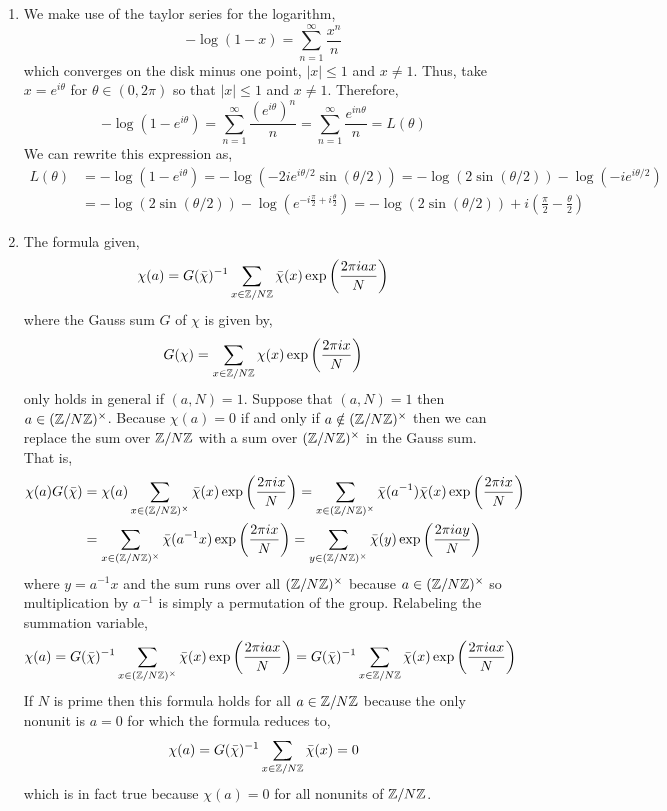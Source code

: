 \documentclass[12pt]{extarticle}
\begin{document}
\begin{enumerate}
\begin{enumerate}
\item We make use of the taylor series for the logarithm,
\[ -\log(1 - x) = \sum_{n = 1}^\infty \frac{x^n}{n}  \]
which converges on the disk minus one point, $|x| \le 1$ and $x \neq 1$. Thus, take $x = e^{i \theta}$ for $\theta \in (0, 2 \pi)$ so that $|x| \le 1$ and $x \neq 1$. Therefore,
\[ -\log(1 - e^{i \theta}) = \sum_{n = 1}^\infty \frac{(e^{i \theta})^n}{n} = \sum_{n = 1}^\infty \frac{e^{i n \theta}}{n} = L(\theta)\]
We can rewrite this expression as,
\begin{align*} 
L(\theta) & = - \log(1 - e^{i \theta}) = - \log(-2 i e^{i \theta/2} \sin{(\theta/2)}) = - \log(2\sin{(\theta/2)}) - \log{(-i e^{i \theta/2})} \\ & = - \log(2\sin{(\theta/2)}) - \log(e^{-i\frac{\pi}{2} + i \frac{\theta}{2}}) = - \log(2\sin{(\theta/2)}) + i\left(\frac{\pi}{2} - \frac{\theta}{2}\right) 
\end{align*}

\item The formula given, 
\[ \chi(a) = G(\bar{\chi})^{-1} \sum_{x \in \mathbb{Z} / N \mathbb{Z}} \bar{\chi}(x) \exp{\left(\frac{2\pi i ax}{N}\right)}\]
where the Gauss sum $G$ of $\chi$ is given by,
\[G(\chi) = \sum_{x \in \mathbb{Z} / N \mathbb{Z}} \chi(x) \exp{\left(\frac{2\pi i x}{N}\right)}\]
only holds in general if $(a, N) = 1$. Suppose that $(a, N) = 1$ then $a \in (\mathbb{Z} / N \mathbb{Z})^\times$. Because $\chi(a) = 0$ if and only if $a \notin (\mathbb{Z} / N \mathbb{Z})^\times$ then we can replace the sum over $\mathbb{Z} / N \mathbb{Z}$ with a sum over $(\mathbb{Z} / N \mathbb{Z})^\times$ in the Gauss sum. That is,
\begin{align*}
\chi(a) G(\bar{\chi}) & = \chi(a) \sum_{x \in (\mathbb{Z} / N \mathbb{Z})^\times} \bar{\chi}(x) \exp{\left(\frac{2\pi i x}{N}\right)} = \sum_{x \in (\mathbb{Z} / N \mathbb{Z})^\times} \bar{\chi}(a^{-1}) \bar{\chi}(x) \exp{\left(\frac{2\pi i x}{N}\right)} \\ & = \sum_{x \in (\mathbb{Z} / N \mathbb{Z})^\times} \bar{\chi}(a^{-1} x) \exp{\left(\frac{2\pi i x}{N}\right)} = \sum_{y \in (\mathbb{Z} / N \mathbb{Z})^\times} \bar{\chi}(y) \exp{\left(\frac{2\pi i ay}{N}\right)} 
\end{align*}
where $y = a^{-1}x$ and the sum runs over all $(\mathbb{Z} / N \mathbb{Z})^\times$ because $a \in (\mathbb{Z} / N \mathbb{Z})^\times$ so multiplication by $a^{-1}$ is simply a permutation of the group. Relabeling the summation variable,
\[ \chi(a) = G(\bar{\chi})^{-1} \sum_{x \in (\mathbb{Z} / N \mathbb{Z})^\times} \bar{\chi}(x) \exp{\left(\frac{2\pi i ax}{N}\right)} = G(\bar{\chi})^{-1} \sum_{x \in \mathbb{Z} / N \mathbb{Z}} \bar{\chi}(x) \exp{\left(\frac{2\pi i ax}{N}\right)} \]
If $N$ is prime then this formula holds for all $a \in \mathbb{Z} / N \mathbb{Z}$ because the only nonunit is $a = 0$ for which the formula reduces to,
\[\chi(a) = G(\bar{\chi})^{-1} \sum_{x \in \mathbb{Z} / N \mathbb{Z}} \bar{\chi}(x) = 0\] which is in fact true because $\chi(a) = 0$ for all nonunits of $\mathbb{Z} / N \mathbb{Z}$.


\end{enumerate}
\end{enumerate}
\end{document}

